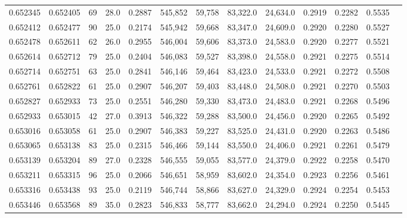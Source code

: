 \begin{tabular}{rrrrrrrrrrrrr}
0.652345 & 0.652405 &    69 & 28.0 &                                     0.2887 & 545,852 &  59,758 &  83,322.0 &  24,634.0 & 0.2919 & 0.2282 & 0.5535 \\
0.652412 & 0.652477 &    90 & 25.0 &                                     0.2174 & 545,942 &  59,668 &  83,347.0 &  24,609.0 & 0.2920 & 0.2280 & 0.5527 \\
0.652478 & 0.652611 &    62 & 26.0 &                                     0.2955 & 546,004 &  59,606 &  83,373.0 &  24,583.0 & 0.2920 & 0.2277 & 0.5521 \\
0.652614 & 0.652712 &    79 & 25.0 &                                     0.2404 & 546,083 &  59,527 &  83,398.0 &  24,558.0 & 0.2921 & 0.2275 & 0.5514 \\
0.652714 & 0.652751 &    63 & 25.0 &                                     0.2841 & 546,146 &  59,464 &  83,423.0 &  24,533.0 & 0.2921 & 0.2272 & 0.5508 \\
0.652761 & 0.652822 &    61 & 25.0 &                                     0.2907 & 546,207 &  59,403 &  83,448.0 &  24,508.0 & 0.2921 & 0.2270 & 0.5503 \\
0.652827 & 0.652933 &    73 & 25.0 &                                     0.2551 & 546,280 &  59,330 &  83,473.0 &  24,483.0 & 0.2921 & 0.2268 & 0.5496 \\
0.652933 & 0.653015 &    42 & 27.0 &                                     0.3913 & 546,322 &  59,288 &  83,500.0 &  24,456.0 & 0.2920 & 0.2265 & 0.5492 \\
0.653016 & 0.653058 &    61 & 25.0 &                                     0.2907 & 546,383 &  59,227 &  83,525.0 &  24,431.0 & 0.2920 & 0.2263 & 0.5486 \\
0.653065 & 0.653138 &    83 & 25.0 &                                     0.2315 & 546,466 &  59,144 &  83,550.0 &  24,406.0 & 0.2921 & 0.2261 & 0.5479 \\
0.653139 & 0.653204 &    89 & 27.0 &                                     0.2328 & 546,555 &  59,055 &  83,577.0 &  24,379.0 & 0.2922 & 0.2258 & 0.5470 \\
0.653211 & 0.653315 &    96 & 25.0 &                                     0.2066 & 546,651 &  58,959 &  83,602.0 &  24,354.0 & 0.2923 & 0.2256 & 0.5461 \\
0.653316 & 0.653438 &    93 & 25.0 &                                     0.2119 & 546,744 &  58,866 &  83,627.0 &  24,329.0 & 0.2924 & 0.2254 & 0.5453 \\
0.653446 & 0.653568 &    89 & 35.0 &                                     0.2823 & 546,833 &  58,777 &  83,662.0 &  24,294.0 & 0.2924 & 0.2250 & 0.5445 \\

\end{tabular}
